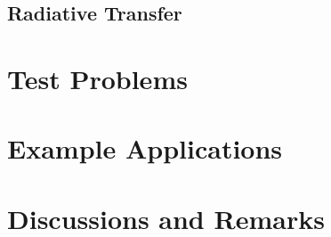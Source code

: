 \subsection{Radiative Transfer}
\label{sec:radiative-transfer}


\section{Test Problems}
\label{sec:test-problems}

\section{Example Applications}
\label{sec:example-applications}

\section{Discussions and Remarks}
\label{sec:discussions}